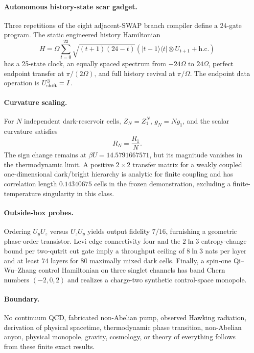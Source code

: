 \paragraph{Autonomous history-state scar gadget.}
Three repetitions of the eight adjacent-SWAP branch compiler define a 24-gate program.  The static engineered history Hamiltonian
\[
H=\Omega\sum_{t=0}^{23}\sqrt{(t+1)(24-t)}
\left(|t+1\rangle\langle t|\otimes U_{t+1}+\mathrm{h.c.}\right)
\]
has a 25-state clock, an equally spaced spectrum from $-24\Omega$ to $24\Omega$, perfect endpoint transfer at $\pi/(2\Omega)$, and full history revival at $\pi/\Omega$.  The endpoint data operation is $U_{\rm shift}^3=I$.

\paragraph{Curvature scaling.}
For $N$ independent dark-reservoir cells, $Z_N=Z_1^N$, $g_N=Ng_1$, and the scalar curvature satisfies
\[
R_N=\frac{R_1}{N}.
\]
The sign change remains at $\beta U=14.5791667571$, but its magnitude vanishes in the thermodynamic limit.  A positive $2\times2$ transfer matrix for a weakly coupled one-dimensional dark/bright hierarchy is analytic for finite coupling and has correlation length $0.14340675$ cells in the frozen demonstration, excluding a finite-temperature singularity in this class.

\paragraph{Outside-box probes.}
Ordering $U_yU_z$ versus $U_zU_y$ yields output fidelity $7/16$, furnishing a geometric phase-order transistor.  Levi edge connectivity four and the $2\ln3$ entropy-change bound per two-qutrit cut gate imply a throughput ceiling of $8\ln3$ nats per layer and at least 74 layers for 80 maximally mixed dark cells.  Finally, a spin-one Qi--Wu--Zhang control Hamiltonian on three singlet channels has band Chern numbers $(-2,0,2)$ and realizes a charge-two synthetic control-space monopole.

\paragraph{Boundary.}
No continuum QCD, fabricated non-Abelian pump, observed Hawking radiation, derivation of physical spacetime, thermodynamic phase transition, non-Abelian anyon, physical monopole, gravity, cosmology, or theory of everything follows from these finite exact results.

%
%
